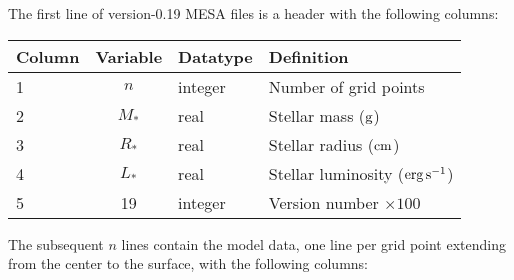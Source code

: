 \documentclass{article}
\newcommand{\Rstar}{\ensuremath{R_{\ast}}}
\newcommand{\Mstar}{\ensuremath{M_{\ast}}}
\newcommand{\Lstar}{\ensuremath{L_{\ast}}}
\newcommand{\cm}{\ensuremath{{\rm cm}}}
\newcommand{\gram}{\ensuremath{{\rm g}}}
\newcommand{\second}{\ensuremath{{\rm s}}}
\newcommand{\erg}{\ensuremath{{\rm erg}}}
\begin{document}
The first line of version-0.19 MESA files is a header with the following
columns:

\begin{table}[h!]
\begin{tabular}{|l|c|l|l|} \hline
Column & Variable & Datatype & Definition \\ \hline
1      & $n$ & integer & Number of grid points \\
2      & \Mstar & real & Stellar mass ($\gram$) \\
3      & \Rstar & real & Stellar radius ($\cm$) \\
4      & \Lstar & real & Stellar luminosity ($\erg\,\second^{-1}$) \\
5      & 19     & integer & Version number $\times 100$ \\ \hline
\end{tabular}
\end{table}

The subsequent $n$ lines contain the model data, one line per
grid point extending from the center to the surface, with the following columns:
\end{document}
